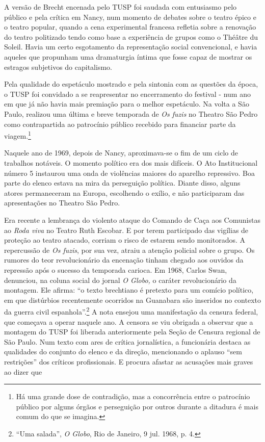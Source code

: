 A versão de Brecht encenada pelo TUSP foi saudada com entusiasmo pelo
público e pela crítica em Nancy, num momento de debates sobre o teatro
épico e o teatro popular, quando a cena experimental francesa refletia
sobre a renovação do teatro politizado tendo como base a experiência de
grupos como o Théâtre du Soleil. Havia um certo esgotamento da
representação social convencional, e havia aqueles que propunham uma
dramaturgia íntima que fosse capaz de mostrar os estragos subjetivos do
capitalismo.

Pela qualidade do espetáculo mostrado e pela sintonia com as questões da
época, o TUSP foi convidado a se reapresentar no encerramento do
festival - num ano em que já não havia mais premiação para o melhor
espetáculo. Na volta a São Paulo, realizou uma última e breve temporada
de \textit{Os fuzis} no Theatro São Pedro como contrapartida ao patrocínio
público recebido para financiar parte da viagem.\footnote{Há uma grande
  dose de contradição, mas a concorrência entre o patrocínio público por
  alguns órgãos e perseguição por outros durante a ditadura é mais comum
  do que se imagina.}

Naquele ano de 1969, depois de Nancy, aproximava-se o fim de um ciclo de
trabalhos notáveis. O momento político era dos mais difíceis. O Ato
Institucional número 5 instaurou uma onda de violências maiores do
aparelho repressivo. Boa parte do elenco estava na mira da perseguição
política. Diante disso, alguns atores permaneceram na Europa, escolhendo
o exílio, e não participaram das apresentações no Theatro São Pedro.

Era recente a lembrança do violento ataque do Comando de Caça aos
Comunistas ao \textit{Roda viva} no Teatro Ruth Escobar. E por terem
participado das vigílias de proteção ao teatro atacado, corriam o risco
de estarem sendo monitorados. A repercussão de \textit{Os fuzis}, por sua
vez, atraiu a atenção policial sobre o grupo. Os rumores do teor
revolucionário da encenação tinham chegado aos ouvidos da repressão após
o sucesso da temporada carioca. Em 1968, Carlos Swan, denunciou, na
coluna social do jornal \textit{O Globo,} o caráter revolucionário da
montagem. Ele afirma: “o texto brechtiano é pretexto para um comício
político, em que distúrbios recentemente ocorridos na Guanabara são
inseridos no contexto da guerra civil espanhola”.\footnote{“Uma salada”,
  \textit{O Globo}, Rio de Janeiro, 9 jul. 1968, p. 4.} A nota ensejou uma
manifestação da censura federal, que começava a operar naquele ano. A
censora se viu obrigada a observar que a montagem do TUSP foi liberada
anteriormente pela Seção de Censura regional de São Paulo. Num texto com
ares de crítica jornalística, a funcionária destaca as qualidades do
conjunto do elenco e da direção, mencionando o aplauso “sem restrições”
dos críticos profissionais. E procura afastar as acusações mais graves
ao dizer que

